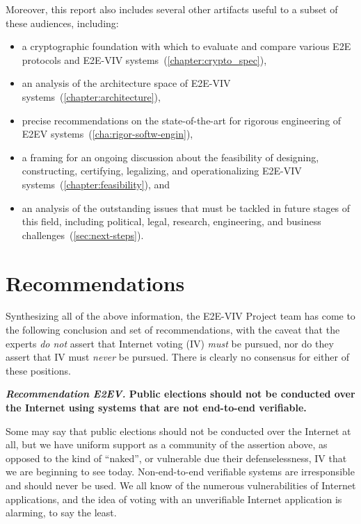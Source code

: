 Moreover, this report also includes several other artifacts useful to
a subset of these audiences, including:
\begin{itemize}
\item a cryptographic foundation with which to evaluate and compare
  various E2E protocols and E2E-VIV
  systems~(\autoref{chapter:crypto_spec}),
\item an analysis of the architecture space of E2E-VIV
  systems~(\autoref{chapter:architecture}),
\item precise recommendations on the state-of-the-art for rigorous
  engineering of E2EV systems~(\autoref{cha:rigor-softw-engin}),
\item a framing for an ongoing discussion about the feasibility of
  designing, constructing, certifying, legalizing, and operationalizing
  E2E-VIV systems~(\autoref{chapter:feasibility}), and
\item an analysis of the outstanding issues that must be tackled in
  future stages of this field, including political, legal, research,
  engineering, and business challenges~(\autoref{sec:next-steps}).
\end{itemize}

\section{Recommendations}

Synthesizing all of the above information, the E2E-VIV Project team
has come to the following conclusion and set of recommendations, with
the caveat that the experts \emph{do not} assert that Internet voting
(IV) \emph{must} be pursued, nor do they assert that IV must
\emph{never} be pursued. There is clearly no consensus for either of
these positions.

\begin{center}
  \textbf{\emph{Recommendation E2EV.} Public elections should not be
    conducted over the Internet using systems that are not end-to-end
    verifiable.}
\end{center}

Some may say that public elections should not be conducted over the
Internet at all, but we have uniform support as a community of the
assertion above, as opposed to the kind of ``naked'', or vulnerable
due their defenselessness, IV that we are beginning to see
today. Non-end-to-end verifiable systems are irresponsible and should
never be used. We all know of the numerous vulnerabilities of Internet
applications, and the idea of voting with an unverifiable Internet
application is alarming, to say the least.

